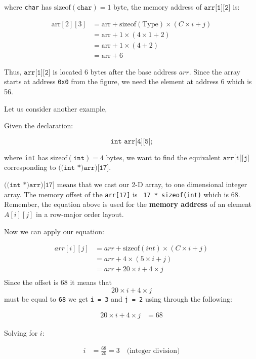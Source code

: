 where \texttt{char} has \(\text{sizeof}(\texttt{char}) = 1\) byte, the memory address of \(\texttt{arr[1][2]}\) is:

\begin{align*}
    \text{arr}[2][3] &= \text{arr} + \text{sizeof}(\text{Type}) \times (C \times i + j) \\
    &= \text{arr} + 1 \times (4 \times 1 + 2) \\
    &= \text{arr} + 1 \times (4 + 2) \\
    &= \text{arr} + 6
\end{align*}


Thus, \(\texttt{arr[1][2]}\) is located 6 bytes after the base address \( arr \).
Since the array starts at address \texttt{0x0} from the figure, we need the element at address 6 which is 56. 

\noindent Let us consider another example, 

Given the declaration:

\[
\texttt{int arr[4][5];}
\]

where \texttt{int} has \(\text{sizeof}(\texttt{int}) = 4\) bytes, we want to find the equivalent \(\texttt{arr[i][j]}\) corresponding to \(\texttt{((int *)arr)[17]}\).

\(\texttt{((int *)arr)[17]}\) means that we cast our 2-D array, to one dimensional integer array. The memory offset of the \texttt{arr[17]} is \texttt{ 17 * sizeof(int)} which is 68. Remember, the equation above is used for the \textbf{memory address} of an element \( A[i][j] \) in a row-major order layout.

Now we can apply our equation:

\begin{align*}
arr[i][j] &= arr + \text{sizeof}(int) \times (C \times i + j) \\
        &= arr + 4 \times (5 \times i + j) \\
        &= arr + 20 \times i + 4 \times j \\
\end{align*}
Since the offset is 68 it means that \[
20 \times i + 4 \times j
\] 
must be equal to \texttt{68} we get \texttt{i = 3} and \texttt{j = 2} using through the following: 

\begin{align*}
20 \times i + 4 \times j &= 68
\end{align*}

Solving for \( i \):

\begin{align*}
i &= \frac{68}{20} = 3 \quad \text{(integer division)}
\end{align*}

